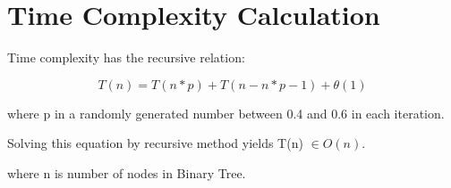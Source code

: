 \documentclass{article}
\begin{document}
\section{Time Complexity Calculation}

Time complexity has the recursive relation:

\[ T(n) = T(n*p) + T(n-n*p-1) + \theta(1) \]

where p in a randomly generated number between 0.4 and 0.6 in each iteration.

Solving this equation by recursive method yields T(n) $\in O(n)$.

where n is number of nodes in Binary Tree.
\end{document}
